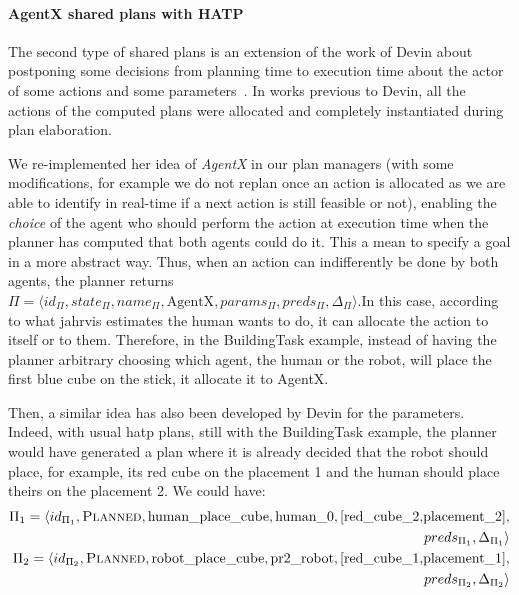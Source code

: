 \documentclass[a4paper,11pt,twoside]{StyleThese}
\begin{document}
\paragraph{AgentX shared plans with HATP}
The second type of shared plans is an extension of the work of Devin about postponing some decisions from planning time to execution time about the actor of some actions and some parameters~\cite{devin_2017_decisions}. In works previous to Devin, all the actions of the computed plans were allocated and completely instantiated during plan elaboration. 

We re-implemented her idea of \emph{AgentX} in our plan managers (with some modifications, for example we do not replan once an action is allocated as we are able to identify in real-time if a next action is still feasible or not), enabling the \emph{choice} of the agent who should perform the action at execution time when the planner has computed that both agents could do it. This a mean to specify a goal in a more abstract way. Thus, when an action can indifferently be done by both agents, the planner returns  $\Pi=\langle id_\Pi,state_\Pi,name_\Pi,\text{AgentX},params_\Pi,preds_\Pi,\Delta_\Pi\rangle$.In this case, according to what \acrshort{jahrvis} estimates the human wants to do, it can allocate the action to itself or to them. Therefore, in the BuildingTask example, instead of having the planner arbitrary choosing which agent, the human or the robot, will place the first blue cube on the stick, it allocate it to AgentX.
\thispagestyle{example}

Then, a similar idea has also been developed by Devin for the parameters. Indeed, with usual \acrshort{hatp} plans, still with the BuildingTask example, the planner would have generated a plan where it is already decided that the robot should place, for example, its red cube on the placement 1 and the human should place theirs on the placement 2. We could have:
\begin{align*}
	\Pi_1=\langle id_{\Pi_1},\textsc{Planned},\text{human\_place\_cube},\text{human\_0}, [\text{red\_cube\_2,placement\_2}],&\\ preds_{\Pi_1},\Delta_{\Pi_1}\rangle&\\
	\Pi_2=\langle id_{\Pi_2},\textsc{Planned},\text{robot\_place\_cube},\text{pr2\_robot}, [\text{red\_cube\_1,placement\_1}],&\\ preds_{\Pi_2},\Delta_{\Pi_2}\rangle&
\end{align*}
  
\end{document}
